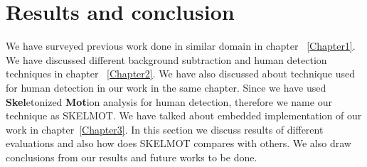 \chapter{Results and conclusion} %
\label{Chapter4}
\indent We have surveyed previous work done in similar domain in chapter
~\ref{Chapter1}. We have discussed different background subtraction and
human detection techniques in chapter ~\ref{Chapter2}. We have also
discussed about technique used for human detection in our work in the
same chapter. Since we have used \textbf{Skel}etonized \textbf{Mot}ion
analysis for human detection, therefore we name our technique as
SKELMOT. We have talked about embedded implementation of our work in
chapter~\ref{Chapter3}. In this section we discuss results of different
evaluations and also how does SKELMOT compares with others. We also draw
conclusions from our results and future works to be done.
